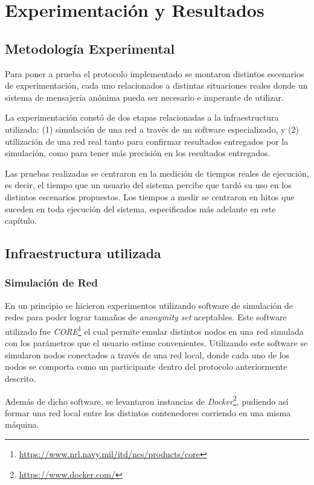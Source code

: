 \chapter{Experimentación y Resultados}\label{cap5}

\section{Metodología Experimental}

Para poner a prueba el protocolo implementado se montaron 
distintos escenarios de experimentación, cada uno relacionados 
a distintas situaciones reales donde un sistema de mensajería 
anónima pueda ser necesario e imperante de utilizar.

La experimentación constó de dos etapas relacionadas a la 
infraestructura utilizada: (1) simulación de una red a través 
de un software especializado, y (2) utilización de una red 
real tanto para confirmar resultados entregados por la simulación, 
como para tener más precisión en los resultados entregados.

Las pruebas realizadas se centraron en la medición de tiempos reales 
de ejecución, es decir, el tiempo que un usuario del sistema 
percibe que tardó su uso en los distintos escenarios propuestos. 
Los tiempos a medir se centraron en hitos que suceden en toda ejecución 
del sistema, especificados más adelante en este capítulo.

\section{Infraestructura utilizada}

\subsection{Simulación de Red}

En un principio se hicieron experimentos utilizando software 
de simulación de redes para poder lograr tamaños de 
\emph{anonymity set} aceptables. Este software utilizado fue 
\emph{CORE}\footnote{\url{https://www.nrl.navy.mil/itd/ncs/products/core}} 
el cual permite emular distintos nodos en una red simulada 
con los parámetros que el usuario estime convenientes. Utilizando 
este software se simularon nodos conectados a través de una red local, 
donde cada uno de los nodos se comporta como un participante dentro 
del protocolo anteriormente descrito.

Además de dicho software, se levantaron instancias de 
\emph{Docker}\footnote{\url{https://www.docker.com/}}, pudiendo así 
formar una red local entre los distintos contenedores corriendo 
en una misma máquina.

